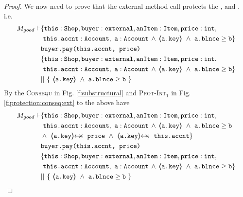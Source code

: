 \begin{proof}
We now need to prove that the external method call  protects the , and . i.e.
\small
\begin{align*}
M_{good} \vdash 
		&\{  \prg{this}:\prg{Shop}, \prg{buyer} : \prg{external}, 
		\prg{anItem} : \prg{Item}, \prg{price} : \prg{int}, \\
		& \ \prg{this.accnt} : \prg{Account},\  \prg{a}:\prg{Account}\, \wedge\, {\inside{\prg{a.key}}}\ \wedge\ {\prg{a.blnce} \geq \prg{b}}\} \\
		  		& \prg{buyer.pay(this.accnt, price)}\ \\  
		&\{  \prg{this}:\prg{Shop}, \prg{buyer} : \prg{external}, 
		\prg{anItem} : \prg{Item}, \prg{price} : \prg{int}, \\
		& \ \prg{this.accnt} : \prg{Account},\  \prg{a}:\prg{Account}\, \wedge\, {\inside{\prg{a.key}}}\ \wedge\ {\prg{a.blnce} \geq \prg{b}}\} \\
		& ||\ \{\ {\inside{\prg{a.key}}\ \wedge\ 
							 {\prg{a.blnce} \geq \prg{b}}}\ \}
\end{align*}
\normalsize
By the \textsc{Consequ} in Fig. \ref{f:substructural} and \textsc{Prot-Int}$_1$ in Fig. \ref{f:protection:conseq:ext}  to the above have
\small
\begin{align*}
M_{good} \vdash 
		&\{  \prg{this}:\prg{Shop}, \prg{buyer} : \prg{external}, 
		\prg{anItem} : \prg{Item}, \prg{price} : \prg{int}, \\
		& \ \prg{this.accnt} : \prg{Account},\  \prg{a}:\prg{Account}\, \wedge\, 
			{\inside{\prg{a.key}}}\ \wedge\ {\prg{a.blnce} \geq \prg{b}}\ \\
		& \wedge\ \protectedFrom{\prg{a.key}}{\prg{price}}\ \wedge\ 
				   \protectedFrom{\prg{a.key}}{\prg{this.accnt}}\} \\
		  		& \prg{buyer.pay(this.accnt, price)}\ \\  
		&\{  \prg{this}:\prg{Shop}, \prg{buyer} : \prg{external}, 
		\prg{anItem} : \prg{Item}, \prg{price} : \prg{int}, \\
		& \ \prg{this.accnt} : \prg{Account},\  \prg{a}:\prg{Account}\, \wedge\, {\inside{\prg{a.key}}}\ \wedge\ {\prg{a.blnce} \geq \prg{b}}\} \\
		& ||\ \{\ {\inside{\prg{a.key}}\ \wedge\ 
							 {\prg{a.blnce} \geq \prg{b}}}\ \}
\end{align*}
\normalsize

\end{proof}
